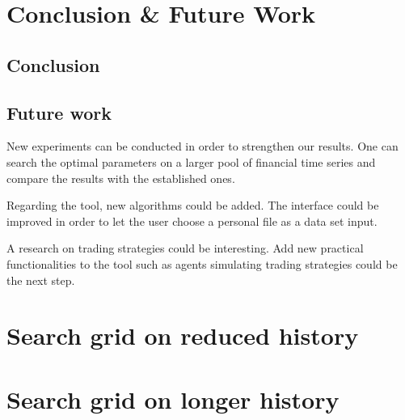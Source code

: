 \documentclass[11pt,a4paper,oneside]{book}
\begin{document}
\chapter{Conclusion \& Future Work }


\section{Conclusion}


\section{Future work}

New experiments can be conducted in order to strengthen our results. One can search the optimal parameters on a larger pool of financial time series and compare the results with the established ones.

Regarding the tool, new algorithms could be added. The interface could be improved in order to let the user choose a personal file as a data set input.

A research on trading strategies could be interesting. Add new practical functionalities to the tool such as agents simulating trading strategies could be the next step.



\clearpage
\appendix
\chapter{Search grid on reduced history}\label{6mapp}














\chapter{Search grid on longer history}\label{10yapp}

















\end{document}
